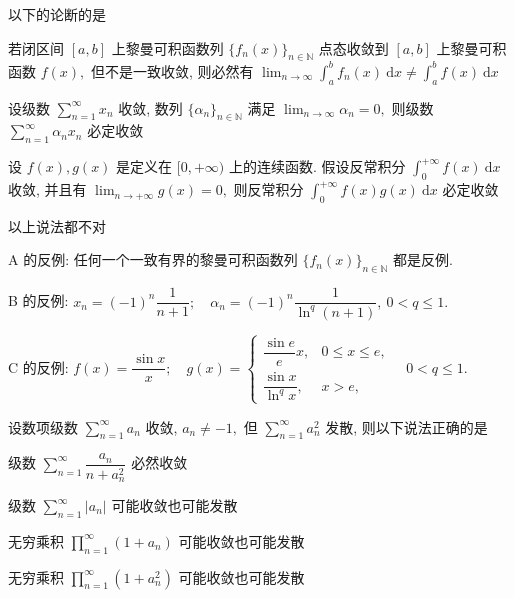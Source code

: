 \begin{question}
以下的论断的是 \paren[D]

\begin{choices}
\item 若闭区间 $[a, b]$ 上黎曼可积函数列 $\{ f_n(x) \}_{n \in \mathbb{N}}$ 点态收敛到 $[a, b]$ 上黎曼可积函数 $f(x),$ 但不是一致收敛, 则必然有 $\displaystyle \lim_{n\to\infty} \int_a^b f_n(x) ~ \mathrm{d}x \neq \int_a^b f(x) ~ \mathrm{d}x$
\item 设级数 $\displaystyle \sum_{n=1}^{\infty} x_n$ 收敛, 数列 $\{ \alpha_n \}_{n \in \mathbb{N}}$ 满足 $\displaystyle \lim_{n \to \infty} \alpha_n = 0,$ 则级数 $\displaystyle \sum_{n=1}^{\infty} \alpha_n x_n$ 必定收敛
\item 设 $f(x), g(x)$ 是定义在 $[0, +\infty)$ 上的连续函数. 假设反常积分 $\displaystyle \int_0^{+\infty} f(x) ~ \mathrm{d} x$ 收敛, 并且有 $\displaystyle \lim_{n\to+\infty} g(x) = 0,$ 则反常积分 $\displaystyle \int_0^{+\infty} f(x)g(x) ~ \mathrm{d} x$ 必定收敛
\item 以上说法都不对
\end{choices}
\end{question}

\begin{solution}
A 的反例: 任何一个一致有界的黎曼可积函数列 $\{ f_n(x) \}_{n \in \mathbb{N}}$ 都是反例.

B 的反例: $\displaystyle x_n = (-1)^n \dfrac{1}{n + 1}; \quad \alpha_n = (-1)^n \dfrac{1}{\ln^q (n + 1)}, ~ 0 < q \leqslant 1.$

C 的反例: $\displaystyle f(x) = \dfrac{\sin x}{x}; \quad g(x) = \begin{cases}
\dfrac{\sin e}{e} x, & 0 \leqslant x \leqslant e, \\
\dfrac{\sin x}{\ln^q x}, & x > e,
\end{cases} \quad 0 < q \leqslant 1.$
\end{solution}

\begin{question}
设数项级数 $\displaystyle \sum_{n=1}^{\infty} a_n$ 收敛, $a_n \neq -1,$ 但 $\displaystyle \sum_{n=1}^{\infty} a_n^2$ 发散, 则以下说法正确的是 \paren[A]

\begin{choices}
\item 级数 $\displaystyle \sum_{n=1}^{\infty} \dfrac{a_n}{n + a_n^2}$ 必然收敛
\item 级数 $\displaystyle \sum_{n=1}^{\infty} |a_n|$ 可能收敛也可能发散
\item 无穷乘积 $\displaystyle \prod_{n=1}^{\infty} (1 + a_n)$ 可能收敛也可能发散
\item 无穷乘积 $\displaystyle \prod_{n=1}^{\infty} (1 + a_n^2)$ 可能收敛也可能发散
\end{choices}
\end{question}


